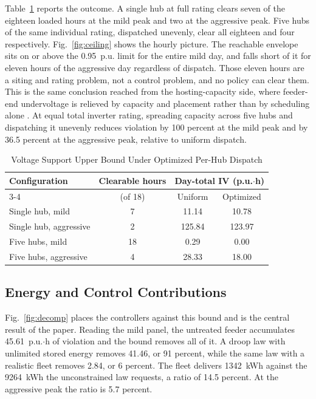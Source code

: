 \documentclass[conference,a4paper]{IEEEtran}
\begin{document}
Table~\ref{tab:ceiling} reports the outcome. A single hub at full rating clears seven of the
eighteen loaded hours at the mild peak and two at the aggressive peak. Five hubs of the same
individual rating, dispatched unevenly, clear all eighteen and four respectively.
Fig.~\ref{fig:ceiling} shows the hourly picture. The reachable envelope sits on or above the
0.95~p.u. limit for the entire mild day, and falls short of it for eleven hours of the
aggressive day regardless of dispatch. Those eleven hours are a siting and rating problem, not
a control problem, and no policy can clear them. This is the same conclusion reached from the
hosting-capacity side, where feeder-end undervoltage is relieved by capacity and placement
rather than by scheduling alone \cite{nazir2024}. At equal total inverter rating, spreading
capacity across five hubs and dispatching it unevenly reduces violation by 100 percent at the
mild peak and by 36.5 percent at the aggressive peak, relative to uniform dispatch.

\begin{table}[t]
\caption{Voltage Support Upper Bound Under Optimized Per-Hub Dispatch}
\label{tab:ceiling}
\centering
\begin{tabular}{lccc}
\toprule
Configuration & Clearable hours & \multicolumn{2}{c}{Day-total IV (p.u.$\cdot$h)} \\
\cmidrule(lr){3-4}
 & (of 18) & Uniform & Optimized \\
\midrule
Single hub, mild       & 7  & 11.14  & 10.78 \\
Single hub, aggressive & 2  & 125.84 & 123.97 \\
Five hubs, mild        & 18 & 0.29   & 0.00 \\
Five hubs, aggressive  & 4  & 28.33  & 18.00 \\
\bottomrule
\end{tabular}
\end{table}


\subsection{Energy and Control Contributions}


Fig.~\ref{fig:decomp} places the controllers against this bound and is the central result of
the paper. Reading the mild panel, the untreated feeder accumulates 45.61~p.u.$\cdot$h of
violation and the bound removes all of it. A droop law with unlimited stored energy removes
41.46, or 91 percent, while the same law with a realistic fleet removes 2.84, or 6 percent.
The fleet delivers 1342~kWh against the 9264~kWh the unconstrained law requests, a ratio of
14.5 percent. At the aggressive peak the ratio is 5.7 percent.
\end{document}
